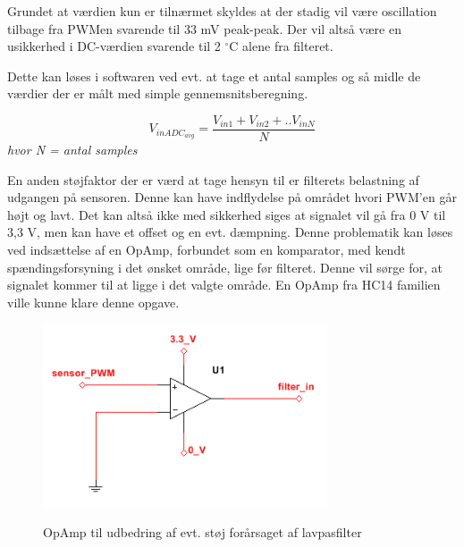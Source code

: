 Grundet at værdien kun er tilnærmet skyldes at der stadig vil være oscillation tilbage fra PWMen svarende til 33 mV peak-peak. Der vil altså være en usikkerhed i DC-værdien svarende til 2 $^{\circ}$C alene fra filteret.

Dette kan løses i softwaren ved evt. at tage et antal samples og så midle de værdier der er målt med simple gennemsnitsberegning. 

\begin{equation}
V_{inADC_{avg}} = \frac{V_{in1} + V_{in2} + .. V_{inN}}{N}
\end{equation} 
\textit{hvor N = antal samples}

En anden støjfaktor der er værd at tage hensyn til er filterets belastning af udgangen på sensoren. Denne kan have indflydelse på området hvori PWM'en går højt og lavt. Det kan altså ikke med sikkerhed siges at signalet vil gå fra 0 V til 3,3 V, men kan have et offset og en evt. dæmpning. Denne problematik kan løses ved indsættelse af en OpAmp, forbundet som en komparator, med kendt spændingsforsyning i det ønsket område, lige før filteret. Denne vil sørge for, at signalet kommer til at ligge i det valgte område. En OpAmp fra HC14 familien ville kunne klare denne opgave. 

\begin{figure}[htb]
\centering
{\includegraphics[width=0.75\textwidth]{filer/design/Billeder/sht_opamp.png}}
\caption{OpAmp til udbedring af evt. støj forårsaget af lavpasfilter}
\label{lab:sht_opamp}
\end{figure}
